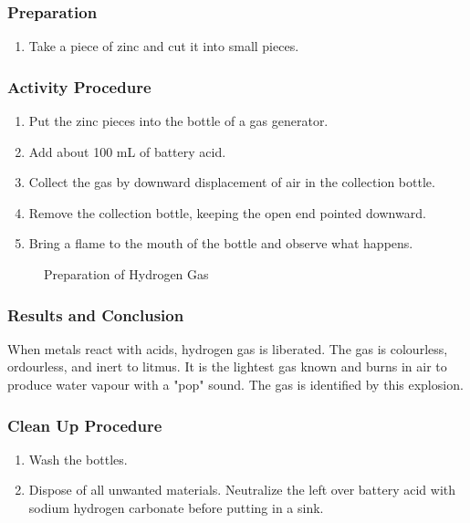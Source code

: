\subsubsection*{Preparation}
\begin{enumerate}
\item{Take a piece of zinc and cut it into small pieces.}
\end{enumerate}

\subsubsection*{Activity Procedure}
\begin{enumerate}
\item{Put the zinc pieces into the bottle of a gas generator.}
\item{Add about 100 mL of battery acid.}
\item{Collect the gas by downward displacement of air in the collection bottle.}
\item{Remove the collection bottle, keeping the open end pointed downward.}
\item{Bring a flame to the mouth of the bottle and observe what happens.}
\end{enumerate}

\begin{figure}[h]
\begin{center}
\def\svgwidth{220pt}

\caption{Preparation of Hydrogen Gas}
\end{center}
\end{figure}

\subsubsection*{Results and Conclusion}
When metals react with acids, hydrogen gas is liberated. The gas is colourless, ordourless, and inert to litmus. It is the lightest gas known and burns in air to produce water vapour with a "pop" sound. The gas is identified by this explosion.

\subsubsection*{Clean Up Procedure}
\begin{enumerate}
\item{Wash the bottles.}
\item{Dispose of all unwanted materials. Neutralize the left over battery acid with sodium hydrogen carbonate before putting in a sink.}
\end{enumerate}

